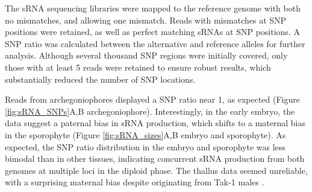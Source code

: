 The sRNA sequencing libraries were mapped to the reference genome with both no mismatches, and allowing one mismatch. Reads with mismatches at SNP positions were retained, as well as perfect matching sRNAs at SNP positions. A SNP ratio was calculated between the alternative and reference alleles for further analysis. Although several thousand SNP regions were initially covered, only those with at least 5 reads were retained to ensure robust results, which substantially reduced the number of SNP locations. 

Reads from archegoniophores displayed a SNP ratio near 1, as expected (Figure \ref{fig:sRNA_SNPs}A,B archegoniophore). Interestingly, in the early embryo, the data suggest a paternal bias in sRNA production, which shifts to a maternal bias in the sporophyte (Figure \ref{fig:sRNA_sizes}A,B embryo and sporophyte). As expected, the SNP ratio distribution in the embryo and sporophyte was less bimodal than in other tissues, indicating concurrent sRNA production from both genomes at multiple loci in the diploid phase. The thallus data seemed unreliable, with a surprising maternal bias despite originating from Tak-1 males \cite{RN265}.

